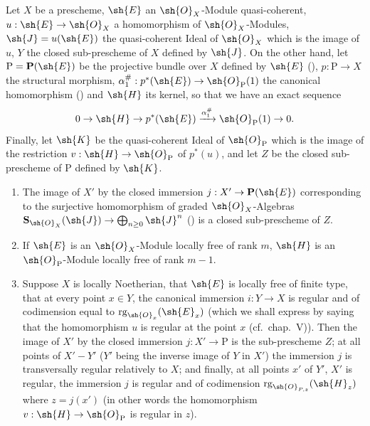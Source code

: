 \begin{proposition}[19.4.11]
\label{IV.19.4.11}
Let $X$ be a prescheme, $\sh{E}$ an $\sh{O}_X$-Module quasi-coherent, $u:\sh{E}\to\sh{O}_X$ a homomorphism of $\sh{O}_X$-Modules, $\sh{J}=u(\sh{E})$ the quasi-coherent Ideal of $\sh{O}_X$ which is the image of $u$, $Y$ the closed sub-prescheme of $X$ defined by $\sh{J}$.
On the other hand, let $\mathrm{P}=\mathbf{P}(\sh{E})$ be the projective bundle over $X$ defined by $\sh{E}$ (), $p:\mathrm{P}\to X$ the structural morphism, $\alpha_1^{\#}:p^*(\sh{E})\to\sh{O}_{\mathrm{P}}(1)$ the canonical homomorphism () and $\sh{H}$ its kernel, so that we have an exact sequence
\[
  0\to\sh{H}\to p^*(\sh{E})\xrightarrow{\alpha_1^{\#}}\sh{O}_{\mathrm{P}}(1)\to 0.
\]
Finally, let $\sh{K}$ be the quasi-coherent Ideal of $\sh{O}_{\mathrm{P}}$ which is the image of the restriction $v:\sh{H}\to\sh{O}_{\mathrm{P}}$ of $p^*(u)$, and let $Z$ be the closed sub-prescheme of $\mathrm{P}$ defined by $\sh{K}$.
\begin{enumerate}[label=(\roman*)]
  \item The image of $X'$ by the closed immersion $j:X'\to\mathbf{P}(\sh{E})$ corresponding to the surjective homomorphism of graded $\sh{O}_X$-Algebras $\mathbf{S}_{\sh{O}_X}(\sh{J})\to\bigoplus_{n\geq 0}\sh{J}^n$ () is a closed sub-prescheme of $Z$.
  \item If $\sh{E}$ is an $\sh{O}_X$-Module locally free of rank $m$, $\sh{H}$ is an $\sh{O}_{\mathrm{P}}$-Module locally free of rank $m-1$.
  \item Suppose $X$ is locally Noetherian, that $\sh{E}$ is locally free of finite type, that at every point $x\in Y$, the canonical immersion $i:Y\to X$ is regular and of codimension equal to $\operatorname{rg}_{\sh{O}_x}(\sh{E}_x)$ (which we shall express by saying that the homomorphism $u$ is regular at the point $x$ (cf.\ chap.~V)).
Then the image of $X'$ by the closed immersion $j:X'\to\mathrm{P}$ is the sub-prescheme $Z$; at all points of $X'-Y'$ ($Y'$ being the inverse image of $Y$ in $X'$) the immersion $j$ is transversally regular relatively to $X$; and finally, at all points $x'$ of $Y'$, $X'$ is regular, the immersion $j$ is regular and of codimension $\operatorname{rg}_{\sh{O}_{P,z}}(\sh{H}_z)$ where $z=j(x')$ (in other words the homomorphism $v:\sh{H}\to\sh{O}_{\mathrm{P}}$ is regular in $z$).
\end{enumerate}
\end{proposition}


